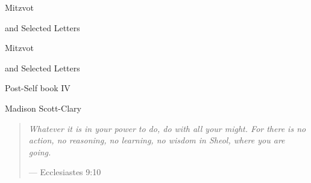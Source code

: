 \documentclass[11pt]{memoir}
\begin{document}
  \frontmatter

  \thispagestyle{empty}
  \null
  \vfill
  \begin{flushright}
    \DisplayFont Mitzvot
    
    \vspace{1ex}

    {\footnotesize and Selected Letters}
  \end{flushright}
  \vfill
  \cleardoublepage

  \pagestyle{empty}

  \doublespacing

  \begin{flushright}
    \null
    \vfill
    {\Huge\DisplayFont Mitzvot}

    \vspace{1ex}

    {\Large\DisplayFont and Selected Letters}

    {\DisplayFont Post-Self book IV}

    \vfill

    {\Large\DisplayFont Madison Scott-Clary}
  \end{flushright}
  \thispagestyle{empty}

  \newpage

  

  \tableofcontents*
  \newpage
  \null
  \cleardoublepage



  \mainmatter

  \pagestyle{ourbook}

  \cleardoublepage
  \null
  \thispagestyle{empty}
  \vfill
  \begin{quote}
    \small
    \emph{Whatever it is in your power to do, do with all your might. For there is no action, no reasoning, no learning, no wisdom in Sheol, where you are going.}

    --- Ecclesiastes 9:10
  \end{quote}
  \vfill
\end{document}
